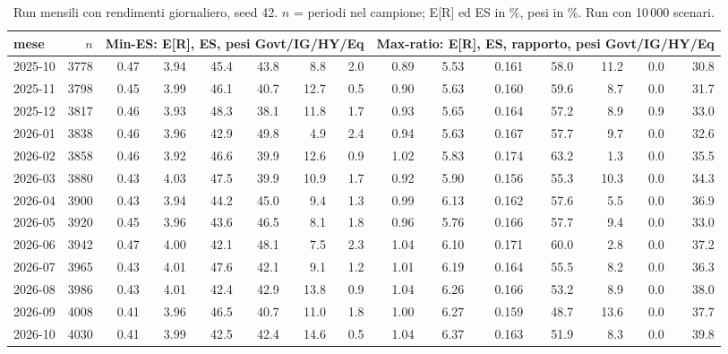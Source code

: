 \begin{table}[htbp]\centering\scriptsize\setlength{\tabcolsep}{3.5pt}
\caption{Run mensili con rendimenti giornaliero, seed 42. $n$ = periodi nel campione; E[R] ed ES in \%, pesi in \%. Run con 10\,000 scenari.}\label{tab:runs_daily_10k}
\begin{tabular}{lrrrrrrrrrrrrrr}\toprule
mese & $n$ & \multicolumn{6}{c}{Min-ES: E[R], ES, pesi Govt/IG/HY/Eq} & \multicolumn{7}{c}{Max-ratio: E[R], ES, rapporto, pesi Govt/IG/HY/Eq} \\\midrule
2025-10 & 3778 & 0.47 & 3.94 & 45.4 & 43.8 & 8.8 & 2.0 & 0.89 & 5.53 & 0.161 & 58.0 & 11.2 & 0.0 & 30.8 \\
2025-11 & 3798 & 0.45 & 3.99 & 46.1 & 40.7 & 12.7 & 0.5 & 0.90 & 5.63 & 0.160 & 59.6 & 8.7 & 0.0 & 31.7 \\
2025-12 & 3817 & 0.46 & 3.93 & 48.3 & 38.1 & 11.8 & 1.7 & 0.93 & 5.65 & 0.164 & 57.2 & 8.9 & 0.9 & 33.0 \\
2026-01 & 3838 & 0.46 & 3.96 & 42.9 & 49.8 & 4.9 & 2.4 & 0.94 & 5.63 & 0.167 & 57.7 & 9.7 & 0.0 & 32.6 \\
2026-02 & 3858 & 0.46 & 3.92 & 46.6 & 39.9 & 12.6 & 0.9 & 1.02 & 5.83 & 0.174 & 63.2 & 1.3 & 0.0 & 35.5 \\
2026-03 & 3880 & 0.43 & 4.03 & 47.5 & 39.9 & 10.9 & 1.7 & 0.92 & 5.90 & 0.156 & 55.3 & 10.3 & 0.0 & 34.3 \\
2026-04 & 3900 & 0.43 & 3.94 & 44.2 & 45.0 & 9.4 & 1.3 & 0.99 & 6.13 & 0.162 & 57.6 & 5.5 & 0.0 & 36.9 \\
2026-05 & 3920 & 0.45 & 3.96 & 43.6 & 46.5 & 8.1 & 1.8 & 0.96 & 5.76 & 0.166 & 57.7 & 9.4 & 0.0 & 33.0 \\
2026-06 & 3942 & 0.47 & 4.00 & 42.1 & 48.1 & 7.5 & 2.3 & 1.04 & 6.10 & 0.171 & 60.0 & 2.8 & 0.0 & 37.2 \\
2026-07 & 3965 & 0.43 & 4.01 & 47.6 & 42.1 & 9.1 & 1.2 & 1.01 & 6.19 & 0.164 & 55.5 & 8.2 & 0.0 & 36.3 \\
2026-08 & 3986 & 0.43 & 4.01 & 42.4 & 42.9 & 13.8 & 0.9 & 1.04 & 6.26 & 0.166 & 53.2 & 8.9 & 0.0 & 38.0 \\
2026-09 & 4008 & 0.41 & 3.96 & 46.5 & 40.7 & 11.0 & 1.8 & 1.00 & 6.27 & 0.159 & 48.7 & 13.6 & 0.0 & 37.7 \\
2026-10 & 4030 & 0.41 & 3.99 & 42.5 & 42.4 & 14.6 & 0.5 & 1.04 & 6.37 & 0.163 & 51.9 & 8.3 & 0.0 & 39.8 \\
\bottomrule\end{tabular}\end{table}


